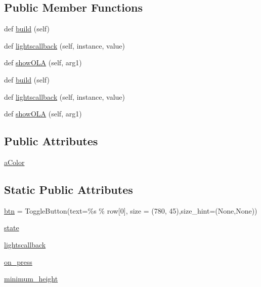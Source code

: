 \subsection*{Public Member Functions}
\begin{DoxyCompactItemize}
\item 
def \hyperlink{classGUI8_1_1TestOLA_ae6d7b035b3472fa673f762bca7c9413c}{build} (self)
\item 
def \hyperlink{classGUI8_1_1TestOLA_a9579284b91b204ce40d6542e44a0e67b}{lightscallback} (self, instance, value)
\item 
def \hyperlink{classGUI8_1_1TestOLA_a675d34e48941e6b9452b13c81ab975db}{show\+O\+LA} (self, arg1)
\item 
def \hyperlink{classGUI8_1_1TestOLA_ae6d7b035b3472fa673f762bca7c9413c}{build} (self)
\item 
def \hyperlink{classGUI8_1_1TestOLA_a9579284b91b204ce40d6542e44a0e67b}{lightscallback} (self, instance, value)
\item 
def \hyperlink{classGUI8_1_1TestOLA_a675d34e48941e6b9452b13c81ab975db}{show\+O\+LA} (self, arg1)
\end{DoxyCompactItemize}
\subsection*{Public Attributes}
\begin{DoxyCompactItemize}
\item 
\hyperlink{classGUI8_1_1TestOLA_a53ce57ed30bffe3d34dd48b5b9da0579}{a\+Color}
\end{DoxyCompactItemize}
\subsection*{Static Public Attributes}
\begin{DoxyCompactItemize}
\item 
\hyperlink{classGUI8_1_1TestOLA_a78e9853d8b616e79fda2e34024a6bd4c}{btn} = Toggle\+Button(text=\textquotesingle{}\%s\textquotesingle{} \% row\mbox{[}0\mbox{]}, size = (780, 45),size\+\_\+hint=(None,None))
\item 
\hyperlink{classGUI8_1_1TestOLA_a3556c0e8e96c798ffa4534bc266a815f}{state}
\item 
\hyperlink{classGUI8_1_1TestOLA_a8ee884d6a8831940d294205f14ac7547}{lightscallback}
\item 
\hyperlink{classGUI8_1_1TestOLA_a2d2baddb978f949678551f521b9cdff0}{on\+\_\+press}
\item 
\hyperlink{classGUI8_1_1TestOLA_adadd8451d0ba699f9cfd55e8d855f7d8}{minimum\+\_\+height}
\end{DoxyCompactItemize}


